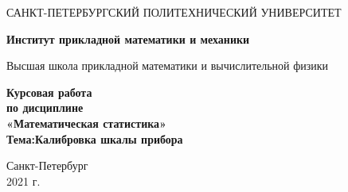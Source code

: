 \begin{titlepage}
   \begin{center}
       \vspace*{3cm}
       \large{САНКТ-ПЕТЕРБУРГСКИЙ ПОЛИТЕХНИЧЕСКИЙ УНИВЕРСИТЕТ}
       \vspace{0.4 cm}

       \large\textbf{Институт прикладной математики и механики}
       \vspace{0.4 cm}

       \large{Высшая школа прикладной математики и вычислительной физики}

       \vspace{3 cm}
       \normalsize\textbf{Курсовая работа\\ по дисциплине\\ «Математическая статистика»
                        \\ Тема:Калибровка шкалы прибора}
       \vfill

       \vspace{0.8cm}


       \normalsize{Санкт-Петербург\\2021 г.}

   \end{center}
\end{titlepage}